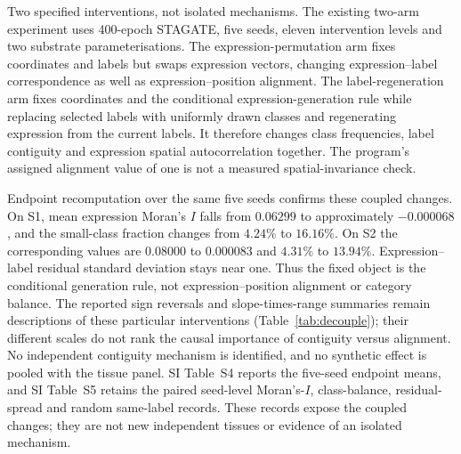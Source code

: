 \documentclass[11pt]{article}
\begin{document}
Two specified interventions, not isolated mechanisms. The existing two-arm experiment uses 400-epoch STAGATE, five seeds, eleven intervention levels and two substrate parameterisations. The expression-permutation arm fixes coordinates and labels but swaps expression vectors, changing expression--label correspondence as well as expression--position alignment. The label-regeneration arm fixes coordinates and the conditional expression-generation rule while replacing selected labels with uniformly drawn classes and regenerating expression from the current labels. It therefore changes class frequencies, label contiguity and expression spatial autocorrelation together. The program's assigned alignment value of one is not a measured spatial-invariance check.

Endpoint recomputation over the same five seeds confirms these coupled changes. On S1, mean expression Moran's $I$ falls from $0.06299$ to approximately $-0.000068$, and the small-class fraction changes from $4.24\%$ to $16.16\%$. On S2 the corresponding values are $0.08000$ to $0.000083$ and $4.31\%$ to $13.94\%$. Expression--label residual standard deviation stays near one. Thus the fixed object is the conditional generation rule, not expression--position alignment or category balance. The reported sign reversals and slope-times-range summaries remain descriptions of these particular interventions (Table~\ref{tab:decouple}); their different scales do not rank the causal importance of contiguity versus alignment. No independent contiguity mechanism is identified, and no synthetic effect is pooled with the tissue panel.
SI Table~S4 reports the five-seed endpoint means, and SI Table~S5 retains
the paired seed-level Moran's-$I$, class-balance, residual-spread and random
same-label records. These records expose the coupled changes; they are not
new independent tissues or evidence of an isolated mechanism.
\end{document}
